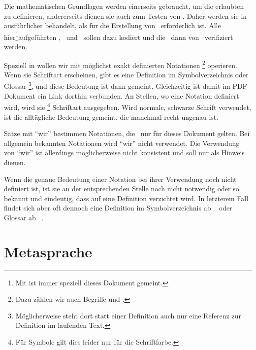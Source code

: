 Die mathematischen Grundlagen werden einerseits gebraucht, um die erlaubten \Beweisschritte{} zu definieren, andererseits dienen sie auch zum Testen von \ASBA.
Daher werden sie in  ausführlicher behandelt, als für die Erstellung von \ASBA\ erforderlich ist.
Alle hier\footnote{Mit  ist immer speziell dieses Dokument gemeint.}aufgeführten \Axiome, \Saetze\ und \Beweise\ sollen dazu kodiert und die \Beweise\ dann von \ASBA\ verifiziert werden.

Speziell in  wollen wir mit möglichst exakt definierten Notationen%
\footnote{%
	Dazu zählen wir auch Begriffe und \Symbole.
}
operieren.
Wenn sie  Schriftart erscheinen, gibt es eine Definition im Symbolverzeichnis oder Glossar%
\footnote{%
	Möglicherweise steht dort statt einer Definition auch nur eine Referenz zur Definition im laufenden Text.
},
und diese Bedeutung ist dann gemeint.
Gleichzeitig ist damit im PDF-Dokument ein Link dorthin verbunden.
An Stellen, wo eine Notation definiert wird, wird sie \footnote{%
	Für Symbole gilt dies leider nur für die Schriftfarbe.
}
Schriftart ausgegeben.
Wird normale, schwarze Schrift verwendet, ist die alltägliche Bedeutung gemeint, die manchmal recht ungenau ist.

Sätze mit "`wir"' bestimmen Notationen, die \textevtl\ nur für dieses Dokument gelten.
Bei allgemein bekannten Notationen wird "`wir"' nicht verwendet.
Die Verwendung von "`wir"' ist allerdings möglicherweise nicht konsistent und soll nur als Hinweis dienen.

Wenn die genaue Bedeutung einer Notation bei ihrer Verwendung noch nicht definiert ist,
ist sie an der entsprechenden Stelle noch nicht notwendig oder so bekannt und eindeutig,
dass auf eine Definition verzichtet wird.
In letzterem Fall findet sich aber oft dennoch eine Definition im Symbolverzeichnis ab \pagename~\pageref{dic-Symbolverzeichnis} oder Glossar ab \pagename~\pageref{dic-Glossar}.

\section     {Metasprache}%
\label   {sec-Metasprache}


